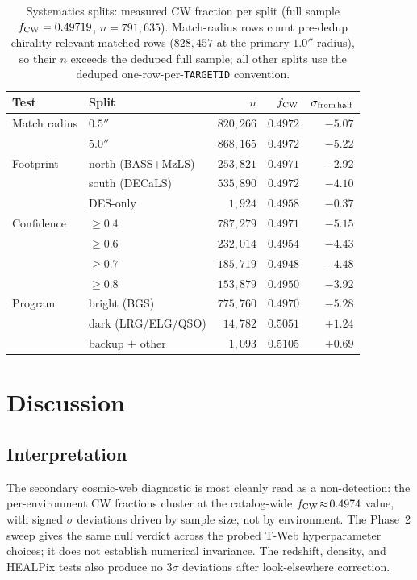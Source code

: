 \documentclass[twocolumn,linenumbers]{aastex702}
\begin{document}
\begin{table}[ht]
\caption{Systematics splits: measured CW fraction per split
(full sample $f_{\rm CW} = 0.49719$, $n = 791{,}635$). Match-radius
rows count pre-dedup chirality-relevant matched rows ($828{,}457$ at
the primary $1.0''$ radius), so their $n$ exceeds the deduped full
sample; all other splits use the deduped one-row-per-\texttt{TARGETID}
convention.}
\label{tab:systematics_splits}
\begin{ruledtabular}
\begin{tabular}{llrrr}
Test & Split & $n$ & $f_{\rm CW}$ & $\sigma_{\rm from\,half}$ \\
\hline
Match radius & $0.5''$ & $820{,}266$ & $0.4972$ & $-5.07$ \\
             & $5.0''$ & $868{,}165$ & $0.4972$ & $-5.22$ \\
Footprint & north (BASS+MzLS) & $253{,}821$ & $0.4971$ & $-2.92$ \\
          & south (DECaLS) & $535{,}890$ & $0.4972$ & $-4.10$ \\
          & DES-only & $1{,}924$ & $0.4958$ & $-0.37$ \\
Confidence & $\ge 0.4$ & $787{,}279$ & $0.4971$ & $-5.15$ \\
           & $\ge 0.6$ & $232{,}014$ & $0.4954$ & $-4.43$ \\
           & $\ge 0.7$ & $185{,}719$ & $0.4948$ & $-4.48$ \\
           & $\ge 0.8$ & $153{,}879$ & $0.4950$ & $-3.92$ \\
Program & bright (BGS) & $775{,}760$ & $0.4970$ & $-5.28$ \\
        & dark (LRG/ELG/QSO) & $14{,}782$ & $0.5051$ & $+1.24$ \\
        & backup $+$ other & $1{,}093$ & $0.5105$ & $+0.69$ \\
\end{tabular}
\end{ruledtabular}
\end{table}

\section{Discussion}\label{sec:discussion}

\subsection{Interpretation}

The secondary cosmic-web diagnostic is most cleanly read as a non-detection: the
per-environment CW fractions cluster at the catalog-wide $f_{\rm CW}
\!\approx\! 0.4974$ value, with signed $\sigma$ deviations driven by
sample size, not by environment. The Phase~2 sweep gives the same null
verdict across the probed T-Web hyperparameter choices; it does not
establish numerical invariance.
The redshift, density, and HEALPix tests also produce no $3\sigma$
deviations after look-elsewhere correction.
\end{document}
